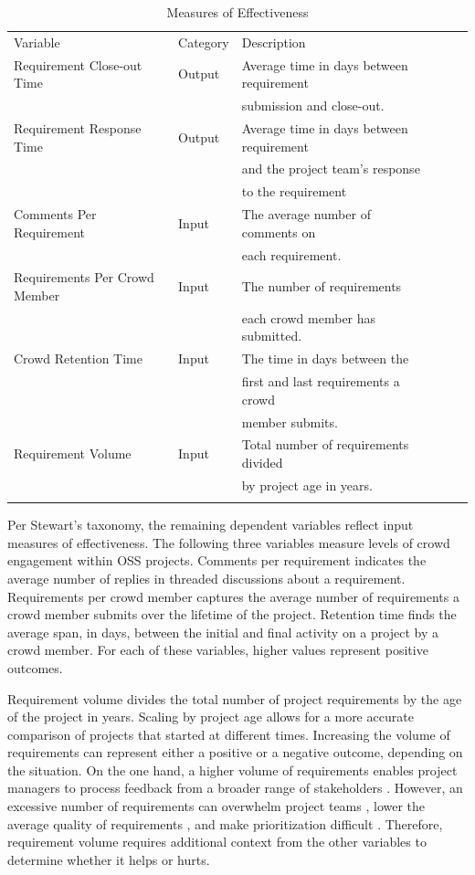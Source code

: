 \begin{table}
\caption{Measures of Effectiveness}
\label{variable_table}
\begin{tabular}{llllll}
\hline\noalign{\smallskip}
Variable & Category & Description  \\
\noalign{\smallskip}\hline\noalign{\smallskip}
Requirement Close-out Time & Output & Average time in days between requirement \\
&& submission and close-out. \\
Requirement Response Time & Output & Average time in days between requirement \\
&& and the project team's response \\
&& to the requirement\\
Comments Per Requirement & Input & The average number of comments on \\
&& each requirement. \\
Requirements Per Crowd Member & Input & The number of requirements \\
&& each crowd member has submitted.\\
Crowd Retention Time & Input & The time in days between the \\ 
&& first and last requirements a crowd \\
&& member submits. \\
Requirement Volume & Input & Total number of requirements divided \\
&& by project age in years.\\
\noalign{\smallskip}\hline
\end{tabular}
\end{table}

Per Stewart's \cite{stewart} taxonomy, the remaining dependent variables reflect input measures of effectiveness. The following three variables measure levels of crowd engagement within OSS projects. Comments per requirement indicates the average number of replies in threaded discussions about a requirement. Requirements per crowd member captures the average number of requirements a crowd member submits over the lifetime of the project. Retention time finds the average span, in days, between the initial and final activity on a project by a crowd member. For each of these variables, higher values represent positive outcomes.

Requirement volume divides the total number of project requirements by the age of the project in years. Scaling by project age allows for a more accurate comparison of projects that started at different times. Increasing the volume of requirements can represent either a positive or a negative outcome, depending on the situation. On the one hand, a higher volume of requirements enables project managers to process feedback from a broader range of stakeholders \cite{hosseini}. However, an excessive number of requirements can overwhelm project teams \cite{groen}, lower the average quality of requirements \cite{groen}, and make prioritization difficult \cite{stakerare, stakenet}. Therefore, requirement volume requires additional context from the other variables to determine whether it helps or hurts.

